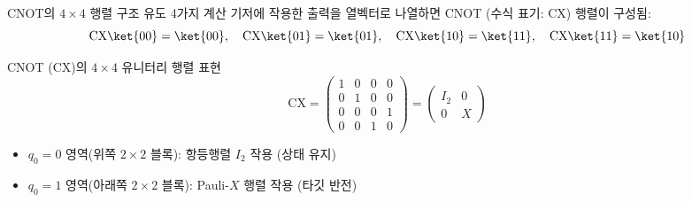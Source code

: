 \documentclass[aspectratio=169, 10pt]{beamer}
\begin{document}
\begin{frame}{CNOT의 $4 \times 4$ 행렬 구조 유도}
    4가지 계산 기저에 작용한 출력을 열벡터로 나열하면 CNOT (수식 표기: $\mathrm{CX}$) 행렬이 구성됨:
    $$\mathrm{CX}\ket{00} = \ket{00}, \quad \mathrm{CX}\ket{01} = \ket{01}, \quad \mathrm{CX}\ket{10} = \ket{11}, \quad \mathrm{CX}\ket{11} = \ket{10}$$
    \pause
    \vspace{0.2cm}
    \begin{qcblock}{CNOT ($\mathrm{CX}$)의 $4 \times 4$ 유니터리 행렬 표현}
        $$\mathrm{CX} = \begin{pmatrix}
        1 & 0 & 0 & 0 \\
        0 & 1 & 0 & 0 \\
        0 & 0 & 0 & 1 \\
        0 & 0 & 1 & 0
        \end{pmatrix} = \begin{pmatrix} I_2 & 0 \\ 0 & X \end{pmatrix}$$
        \begin{itemize}
            \item $q_0=0$ 영역(위쪽 $2 \times 2$ 블록): 항등행렬 $I_2$ 작용 (상태 유지)
            \pause
            \item $q_0=1$ 영역(아래쪽 $2 \times 2$ 블록): Pauli-$X$ 행렬 작용 (타깃 반전)
        \end{itemize}
    \end{qcblock}
\end{frame}
\end{document}
